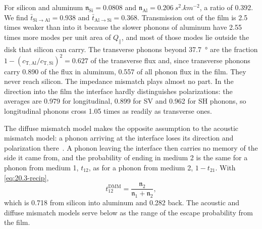 For silicon and aluminum $\mathfrak{n}_{\mathrm{Si}} = 0.0808$ and $\mathfrak{n}_{\mathrm{Al}} = \SI{0.206}{s^2.km^{-2}}$, a ratio of 0.392. We find $\bar t_{\mathrm{Si\to Al}} = 0.938$ and $\bar t_{\mathrm{Al\to Si}} = 0.368$. Transmission out of the film is 2.5 times weaker than into it because the slower phonons of aluminum have 2.55 times more modes per unit area of $Q_\parallel$, and most of those modes lie outside the disk that silicon can carry. The transverse phonons beyond \SI{37.7}{\degree} are the fraction $1 - (c_{\mathrm{T,Al}}/c_{\mathrm{T,Si}})^2 = 0.627$ of the transverse flux and, since transverse phonons carry 0.890 of the flux in aluminum, 0.557 of all phonon flux in the film. They never reach silicon. The impedance mismatch plays almost no part. In the direction into the film the interface hardly distinguishes polarizations: the averages are 0.979 for longitudinal, 0.899 for SV and 0.962 for SH phonons, so longitudinal phonons cross 1.05 times as readily as transverse ones.

The diffuse mismatch model makes the opposite assumption to the acoustic mismatch model: a phonon arriving at the interface loses its direction and polarization there~\cite{swartz1989thermal}. A phonon leaving the interface then carries no memory of the side it came from, and the probability of ending in medium 2 is the same for a phonon from medium 1, $t_{12}$, as for a phonon from medium 2, $1 - t_{21}$. With \cref{eq:20.3-recip},
\begin{equation}
  t^{\mathrm{DMM}}_{12} = \frac{\mathfrak{n}_2}{\mathfrak{n}_1 + \mathfrak{n}_2} ,
  \label{eq:20.3-dmm}
\end{equation}
which is 0.718 from silicon into aluminum and 0.282 back. The acoustic and diffuse mismatch models serve below as the range of the escape probability from the film.

